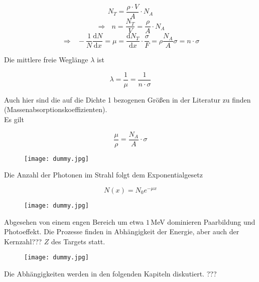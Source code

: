 \[N_T=\frac{\rho\cdot V}{A}\cdot N_A\]
\[\Rightarrow~~~n=\frac{N_T}{V}=\frac{\rho}{A}\cdot N_A\]
\[\Rightarrow~~~-\frac{1}{N}\frac{\mathrm{d}N}{\mathrm{d}x}=\mu=\frac{\mathrm{d}N_T}{\mathrm{d}x}\cdot
\frac{\sigma}{F}=\rho\frac{N_A}{A}\sigma=n\cdot\sigma \]

Die mittlere freie Weglänge $\lambda$ ist

\[ \lambda = \frac{1}{\mu}=\frac{1}{n\cdot \sigma} \]

Auch hier sind die auf die Dichte 1 bezogenen Größen in der Literatur zu finden
(Massenabsorptionskoeffizienten). 
\\
Es gilt

\[ \frac{\mu}{\rho}=\frac{N_A}{A}\cdot \sigma \]

\begin{figure}[H]
	\centering
	\texttt{[image: dummy.jpg]}
\end{figure}

Die Anzahl der Photonen im Strahl folgt dem Exponentialgesetz

\[N(x)=N_0 e^{-\mu x} \]

\begin{figure}[H]
	\centering
	\texttt{[image: dummy.jpg]}
\end{figure}

Abgesehen von einem engen Bereich um etwa $1\,$MeV dominieren Paarbildung und Photoeffekt. Die
Prozesse finden in Abhängigkeit der Energie, aber auch der Kernzahl??? $Z$ des Targets statt. 

\begin{figure}[H]
	\centering
	\texttt{[image: dummy.jpg]}
\end{figure}

Die Abhängigkeiten werden in den folgenden Kapiteln diskutiert. ???

